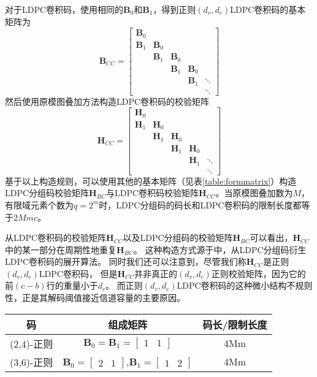对于LDPC卷积码，使用相同的$\mathbf{B}_0$和$\mathbf{B}_1$，得到正则$(d_v,d_c)$LDPC卷积码的基本矩阵为
\begin{equation}
    \mathbf{B}_{CC} = \left[
          \begin{array}{ccccc}
            \mathbf{B}_0 & & & & \\
            \mathbf{B}_1 & \mathbf{B}_0 & & & \\
             & \mathbf{B}_1 & \mathbf{B}_0 & & \\
             & & \mathbf{B}_1 & \mathbf{B}_0 & \\
             & & & \mathbf{B}_1 & \ddots \\
             & & & & \ddots
          \end{array} \right]
\end{equation}
然后使用原模图叠加方法构造LDPC卷积码的校验矩阵
\begin{equation}
    \mathbf{H}_{CC} = \left[
          \begin{array}{ccccc}
            \mathbf{H}_0 & & & & \\
            \mathbf{H}_1 & \mathbf{H}_0 & & & \\
             & \mathbf{H}_1 & \mathbf{H}_0 & & \\
             & & \mathbf{H}_1 & \mathbf{H}_0 & \\
             & & & \mathbf{H}_1 & \ddots \\
             & & & & \ddots
          \end{array} \right]
\end{equation}
基于以上构造规则，可以使用其他的基本矩阵（见表\ref{table:formmatrix}）构造LDPC分组码校验矩阵$\mathbf{H}_{BC}$与LDPC卷积码校验矩阵$\mathbf{H}_{CC}$。当原模图叠加数为$M$，有限域元素个数为$q=2^m$时，LDPC分组码的码长和LDPC卷积码的限制长度都等于$2Mmc$。

从LDPC卷积码的校验矩阵$\mathbf{H}_{CC}$以及LDPC分组码的校验矩阵$\mathbf{H}_{BC}$可以看出，$\mathbf{H}_{CC}$中的某一部分在周期性地重复$\mathbf{H}_{BC}$。
这种构造方式源于\parencite{782171}中，从LDPC分组码衍生LDPC卷积码的展开算法。
同时我们还可以注意到，尽管我们称$\mathbf{H}_{CC}$是正则$(d_v,d_c)$LDPC卷积码，
但是$\mathbf{H}_{CC}$并非真正的$(d_v,d_c)$正则校验矩阵，因为它的前$(c-b)$行的重量小于$d_c$。
而正则$(d_v,d_c)$LDPC卷积码的这种微小结构不规则性，正是其解码阈值接近信道容量的主要原因。
\begin{center}
\label{table:formmatrix}
\begin{tabular}{c|c|c}
 \hline
码 & 组成矩阵 &码长/限制长度 \\ \hline
(2,4)-正则 & 
$\mathbf{B}_0 = \mathbf{B}_1 = [\begin{array}{cc} 1&1 \end{array}]$ & 4Mm \\ \hline
(3,6)-正则 & 
 $\mathbf{B}_0 = [\begin{array}{cc} 2&1 \end{array}]$,$\mathbf{B}_1 = [\begin{array}{cc} 1&2 \end{array}]$ & 4Mm \\ \hline
\end{tabular}
\end{center}